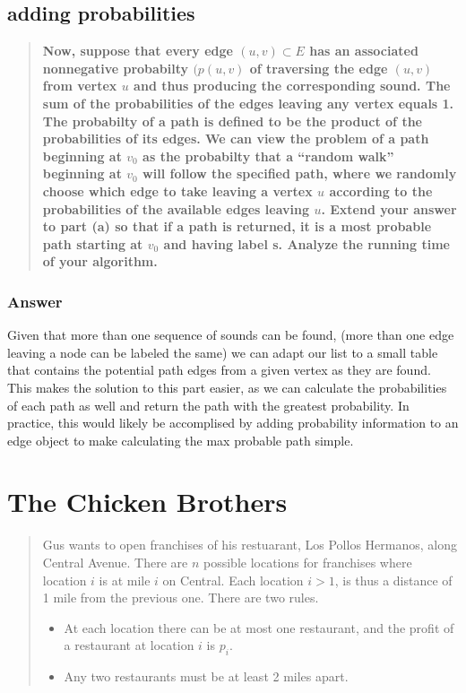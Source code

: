 \documentclass[titlepage]{article}\usepackage[]{graphicx}\usepackage[]{color}
\begin{document}
\subsection{adding probabilities}

\begin{quote}
	\textbf{Now, suppose that every edge $(u,v) \subset E$ has an associated
		nonnegative probabilty $(p(u,v)$ of traversing the edge $(u,v)$ from
		vertex $u$ and thus producing the corresponding sound. The sum of the
		probabilities of the edges leaving any vertex equals 1. The probabilty of
		a path is defined to be the product of the probabilities of its edges. We
		can view the problem of a path beginning at $v_0$ as the probabilty that a
		``random walk'' beginning at $v_0$  will follow the specified path, where
		we randomly choose which edge to take leaving a vertex  $u$ according to
		the probabilities of the available edges leaving $u$. 
		Extend your answer to part (a) so that if a path is returned,
		it is a most probable path starting at $v_0$ and having label s. Analyze
	the running time of your algorithm. }
\end{quote}

\subsubsection{Answer}
Given that more than one sequence of sounds can be found, (more than one edge
leaving a node can be labeled the same) we can adapt our list to a small table
that contains the potential path edges from a given vertex as they are found.
This makes the solution to this part easier, as we can calculate the
probabilities of each path as well and return the path with the greatest
probability. In practice, this would likely be accomplised by adding
probability information to an edge object to make calculating the max probable
path simple.



\section{The Chicken Brothers} 
\begin{quote}
Gus wants to open franchises of his restuarant, Los Pollos Hermanos,
along Central Avenue. There are $n$ possible locations for franchises where
location $i$ is at mile $i$ on Central. Each location $i>1$, is thus a distance
of 1 mile from the previous one. There are two rules.
\begin{itemize}
\item At each location there can be at most one restaurant, and the profit of a
  restaurant at location $i$ is $p_i$. 
  \item Any two restaurants must be at least 2 miles apart.
\end{itemize}
\end{quote}
\end{document}
